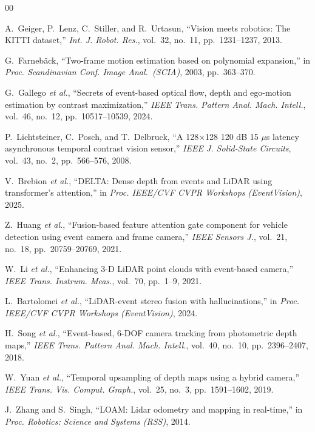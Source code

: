 \documentclass[conference]{IEEEtran}
\begin{document}
\begin{thebibliography}{00}

A.~Geiger, P.~Lenz, C.~Stiller, and R.~Urtasun,
``Vision meets robotics: The KITTI dataset,''
\textit{Int. J. Robot. Res.}, vol.~32, no.~11,
pp.~1231--1237, 2013.

G.~Farneb{\"a}ck,
``Two-frame motion estimation based on polynomial expansion,''
in \textit{Proc. Scandinavian Conf. Image Anal.\ (SCIA)}, 2003,
pp.~363--370.

G.~Gallego \textit{et al.},
``Secrets of event-based optical flow, depth and ego-motion
estimation by contrast maximization,''
\textit{IEEE Trans. Pattern Anal. Mach. Intell.}, vol.~46,
no.~12, pp.~10517--10539, 2024.

P.~Lichtsteiner, C.~Posch, and T.~Delbruck,
``A 128$\times$128 120 dB 15 $\mu$s latency asynchronous
temporal contrast vision sensor,''
\textit{IEEE J. Solid-State Circuits}, vol.~43, no.~2,
pp.~566--576, 2008.

V.~Brebion \textit{et al.},
``DELTA: Dense depth from events and LiDAR using transformer's
attention,''
in \textit{Proc. IEEE/CVF CVPR Workshops (EventVision)}, 2025.

Z.~Huang \textit{et al.},
``Fusion-based feature attention gate component for vehicle
detection using event camera and frame camera,''
\textit{IEEE Sensors J.}, vol.~21, no.~18,
pp.~20759--20769, 2021.

W.~Li \textit{et al.},
``Enhancing 3-D LiDAR point clouds with event-based camera,''
\textit{IEEE Trans. Instrum. Meas.}, vol.~70, pp.~1--9, 2021.

L.~Bartolomei \textit{et al.},
``LiDAR-event stereo fusion with hallucinations,''
in \textit{Proc. IEEE/CVF CVPR Workshops (EventVision)}, 2024.

H.~Song \textit{et al.},
``Event-based, 6-DOF camera tracking from photometric depth
maps,''
\textit{IEEE Trans. Pattern Anal. Mach. Intell.}, vol.~40,
no.~10, pp.~2396--2407, 2018.

W.~Yuan \textit{et al.},
``Temporal upsampling of depth maps using a hybrid camera,''
\textit{IEEE Trans. Vis. Comput. Graph.}, vol.~25, no.~3,
pp.~1591--1602, 2019.

J.~Zhang and S.~Singh,
``LOAM: Lidar odometry and mapping in real-time,''
in \textit{Proc. Robotics: Science and Systems (RSS)}, 2014.

\end{thebibliography}
\end{document}
